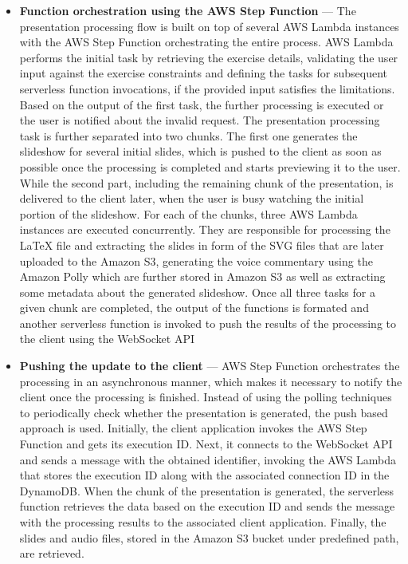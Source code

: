 \begin{itemize}
   \item \textbf{Function orchestration using the AWS Step Function} --- The presentation processing flow is built on top of several AWS Lambda instances with the AWS Step Function orchestrating the entire process.
   AWS Lambda performs the initial task by retrieving the exercise details, validating the user input against the exercise constraints and defining the tasks for subsequent serverless function invocations, if the provided input satisfies the limitations.
   Based on the output of the first task, the further processing is executed or the user is notified about the invalid request.
   The presentation processing task is further separated into two chunks. 
   The first one generates the slideshow for several initial slides, which is pushed to the client as soon as possible once the processing is completed and starts previewing it to the user. While the second part, including the remaining chunk of the presentation, is delivered to the client later, when the user is busy watching the initial portion of the slideshow.
   For each of the chunks, three AWS Lambda instances are executed concurrently. They are responsible for processing the LaTeX file and extracting the slides in form of the SVG files that are later uploaded to the Amazon S3, generating the voice commentary using the Amazon Polly which are further stored in Amazon S3 as well as extracting some metadata about the generated slideshow.
   Once all three tasks for a given chunk are completed, the output of the functions is formated and another serverless function is invoked to push the results of the processing to the client using the WebSocket API
   \item \textbf{Pushing the update to the client} --- AWS Step Function orchestrates the processing in an asynchronous manner, which makes it necessary to notify the client once the processing is finished.
   Instead of using the polling techniques to periodically check whether the presentation is generated, the push based approach is used.
   Initially, the client application invokes the AWS Step Function and gets its execution ID.
   Next, it connects to the WebSocket API and sends a message with the obtained identifier, invoking the AWS Lambda that stores the execution ID along with the associated connection ID in the DynamoDB.
   When the chunk of the presentation is generated, the serverless function retrieves the data based on the execution ID and sends the message with the processing results to the associated client application.
   Finally, the slides and audio files, stored in the Amazon S3 bucket under predefined path, are retrieved.
\end{itemize}

